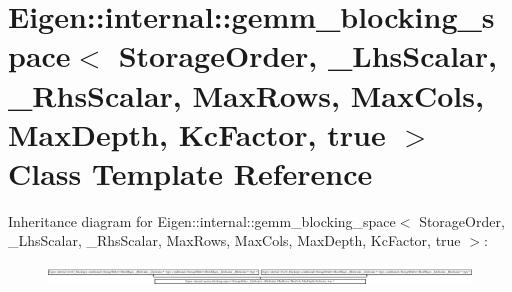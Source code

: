 \hypertarget{class_eigen_1_1internal_1_1gemm__blocking__space_3_01_storage_order_00_01___lhs_scalar_00_01___reb401dd40e11c548a7d5e4b85e19f682}{}\section{Eigen\+:\+:internal\+:\+:gemm\+\_\+blocking\+\_\+space$<$ Storage\+Order, \+\_\+\+Lhs\+Scalar, \+\_\+\+Rhs\+Scalar, Max\+Rows, Max\+Cols, Max\+Depth, Kc\+Factor, true $>$ Class Template Reference}
\label{class_eigen_1_1internal_1_1gemm__blocking__space_3_01_storage_order_00_01___lhs_scalar_00_01___reb401dd40e11c548a7d5e4b85e19f682}
Inheritance diagram for Eigen\+:\+:internal\+:\+:gemm\+\_\+blocking\+\_\+space$<$ Storage\+Order, \+\_\+\+Lhs\+Scalar, \+\_\+\+Rhs\+Scalar, Max\+Rows, Max\+Cols, Max\+Depth, Kc\+Factor, true $>$\+:\begin{figure}[H]
\begin{center}
\leavevmode
\includegraphics[height=0.533842cm]{class_eigen_1_1internal_1_1gemm__blocking__space_3_01_storage_order_00_01___lhs_scalar_00_01___reb401dd40e11c548a7d5e4b85e19f682}
\end{center}
\end{figure}
